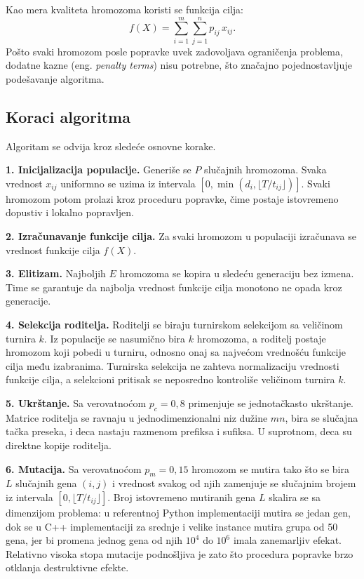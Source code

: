 \documentclass[12pt]{article}
\begin{document}
Kao mera kvaliteta hromozoma koristi se funkcija cilja:
\[
    f(X) = \sum_{i=1}^{m}\sum_{j=1}^{n} p_{ij} \, x_{ij}.
\]
Pošto svaki hromozom posle popravke uvek zadovoljava ograničenja problema, dodatne kazne (eng. \textit{penalty terms}) nisu potrebne, što značajno pojednostavljuje podešavanje algoritma.

\subsection{Koraci algoritma}

Algoritam se odvija kroz sledeće osnovne korake.

\textbf{1. Inicijalizacija populacije.} Generiše se $P$ slučajnih hromozoma. Svaka vrednost $x_{ij}$ uniformno se uzima iz intervala $[0, \min(d_i, \lfloor T/t_{ij} \rfloor)]$. Svaki hromozom potom prolazi kroz proceduru popravke, čime postaje istovremeno dopustiv i lokalno popravljen.

\textbf{2. Izračunavanje funkcije cilja.} Za svaki hromozom u populaciji izračunava se vrednost funkcije cilja $f(X)$.

\textbf{3. Elitizam.} Najboljih $E$ hromozoma se kopira u sledeću generaciju bez izmena. Time se garantuje da najbolja vrednost funkcije cilja monotono ne opada kroz generacije.

\textbf{4. Selekcija roditelja.} Roditelji se biraju turnirskom selekcijom sa veličinom turnira $k$. Iz populacije se nasumično bira $k$ hromozoma, a roditelj postaje hromozom koji pobedi u turniru, odnosno onaj sa najvećom vrednošću funkcije cilja među izabranima. Turnirska selekcija ne zahteva normalizaciju vrednosti funkcije cilja, a selekcioni pritisak se neposredno kontroliše veličinom turnira $k$.

\textbf{5. Ukrštanje.} Sa verovatnoćom $p_c = 0{,}8$ primenjuje se jednotačkasto ukrštanje. Matrice roditelja se ravnaju u jednodimenzionalni niz dužine $mn$, bira se slučajna tačka preseka, i deca nastaju razmenom prefiksa i sufiksa. U suprotnom, deca su direktne kopije roditelja.

\textbf{6. Mutacija.} Sa verovatnoćom $p_m = 0{,}15$ hromozom se mutira tako što se bira $L$ slučajnih gena $(i,j)$ i vrednost svakog od njih zamenjuje se slučajnim brojem iz intervala $[0, \lfloor T/t_{ij} \rfloor]$. Broj istovremeno mutiranih gena $L$ skalira se sa dimenzijom problema: u referentnoj Python implementaciji mutira se jedan gen, dok se u C++ implementaciji za srednje i velike instance mutira grupa od 50 gena, jer bi promena jednog gena od njih $10^4$ do $10^6$ imala zanemarljiv efekat. Relativno visoka stopa mutacije podnošljiva je zato što procedura popravke brzo otklanja destruktivne efekte.
\end{document}
